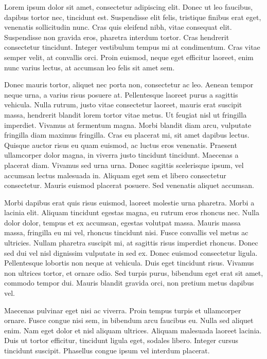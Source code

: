 Lorem ipsum dolor sit amet, consectetur adipiscing elit. Donec ut leo faucibus, dapibus tortor nec, tincidunt est. Suspendisse elit felis, tristique finibus erat eget, venenatis sollicitudin nunc. Cras quis eleifend nibh, vitae consequat elit. Suspendisse non gravida eros, pharetra interdum tortor. Cras hendrerit consectetur tincidunt. Integer vestibulum tempus mi at condimentum. Cras vitae semper velit, at convallis orci. Proin euismod, neque eget efficitur laoreet, enim nunc varius lectus, at accumsan leo felis sit amet sem.

Donec mauris tortor, aliquet nec porta non, consectetur ac leo. Aenean tempor neque urna, a varius risus posuere at. Pellentesque laoreet purus a sagittis vehicula. Nulla rutrum, justo vitae consectetur laoreet, mauris erat suscipit massa, hendrerit blandit lorem tortor vitae metus. Ut feugiat nisl ut fringilla imperdiet. Vivamus at fermentum magna. Morbi blandit diam arcu, vulputate fringilla diam maximus fringilla. Cras eu placerat mi, sit amet dapibus lectus. Quisque auctor risus eu quam euismod, ac luctus eros venenatis. Praesent ullamcorper dolor magna, in viverra justo tincidunt tincidunt. Maecenas a placerat diam. Vivamus sed urna urna. Donec sagittis scelerisque ipsum, vel accumsan lectus malesuada in. Aliquam eget sem et libero consectetur consectetur. Mauris euismod placerat posuere. Sed venenatis aliquet accumsan.

Morbi dapibus erat quis risus euismod, laoreet molestie urna pharetra. Morbi a lacinia elit. Aliquam tincidunt egestas magna, eu rutrum eros rhoncus nec. Nulla dolor dolor, tempus et ex accumsan, egestas volutpat massa. Mauris massa massa, fringilla eu mi vel, rhoncus tincidunt nisi. Fusce convallis vel metus ac ultricies. Nullam pharetra suscipit mi, at sagittis risus imperdiet rhoncus. Donec sed dui vel nisl dignissim vulputate in sed ex. Donec euismod consectetur ligula. Pellentesque lobortis non neque at vehicula. Duis eget tincidunt risus. Vivamus non ultrices tortor, et ornare odio. Sed turpis purus, bibendum eget erat sit amet, commodo tempor dui. Mauris blandit gravida orci, non pretium metus dapibus vel.

Maecenas pulvinar eget nisi ac viverra. Proin tempus turpis et ullamcorper ornare. Fusce congue nisi sem, in bibendum arcu faucibus eu. Nulla sed aliquet enim. Nam eget dolor et nisl aliquam ultrices. Aliquam malesuada laoreet lacinia. Duis ut tortor efficitur, tincidunt ligula eget, sodales libero. Integer cursus tincidunt suscipit. Phasellus congue ipsum vel interdum placerat.

